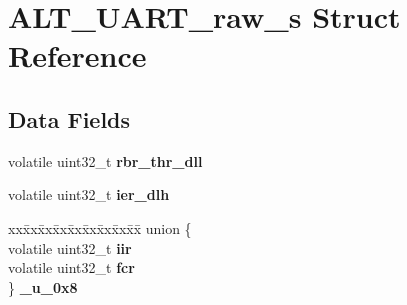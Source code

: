 \hypertarget{structALT__UART__raw__s}{}\section{A\+L\+T\+\_\+\+U\+A\+R\+T\+\_\+raw\+\_\+s Struct Reference}
\label{structALT__UART__raw__s}
\subsection*{Data Fields}
\begin{DoxyCompactItemize}
\item 
\mbox{\label{structALT__UART__raw__s_a00f8dcdd0c6514b025ff0304d867eaa6}} 
volatile uint32\+\_\+t {\bfseries rbr\+\_\+thr\+\_\+dll}
\item 
\mbox{\label{structALT__UART__raw__s_a0b20cb24784a81bf996975219a5b27ac}} 
volatile uint32\+\_\+t {\bfseries ier\+\_\+dlh}
\item 
\mbox{\label{structALT__UART__raw__s_a282034626acd6c25090d80a20b1dd7b9}} 
\begin{tabbing}
xx\=xx\=xx\=xx\=xx\=xx\=xx\=xx\=xx\=\kill
union \{\\
\>volatile uint32\_t {\bfseries iir}\\
\>volatile uint32\_t {\bfseries fcr}\\
\} {\bfseries \_u\_0x8}\\


\end{tabbing}
\end{DoxyCompactItemize}
